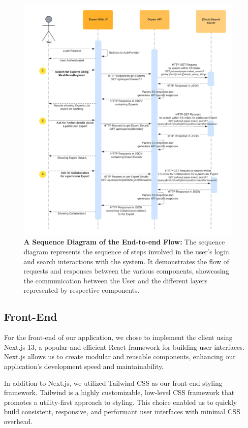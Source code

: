 \begin{figure}[htp]
    \centering
    \includegraphics[width=\textwidth]{Images/SequenceDiagram_GetExperts.png}
    \caption[A Sequence Diagram of the End-to-end Flow]{\textbf{A Sequence Diagram of the End-to-end Flow:} The sequence diagram represents the sequence of steps involved in the user's login and search interactions with the system. It demonstrates the flow of requests and responses between the various components, showcasing the communication between the User and the different layers represented by respective components. }
    \label{fig:sequence-diagram}
\end{figure}


\subsection{Front-End}

For the front-end of our application, we chose to implement the client using Next.js 13, a popular and efficient React framework for building user interfaces. Next.js allows us to create modular and reusable components, enhancing our application's development speed and maintainability. 

In addition to Next.js, we utilized Tailwind CSS as our front-end styling framework. Tailwind is a highly customizable, low-level CSS framework that promotes a utility-first approach to styling. This choice enabled us to quickly build consistent, responsive, and performant user interfaces with minimal CSS overhead. 

